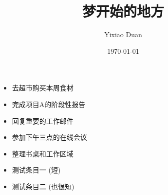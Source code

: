 \documentclass{ctexart}
\title{梦开始的地方}
\author{Yixiao Duan}
\date{\today}
\newcommand{\todo}[1]{\item[\hbox to 1.5em{$\Box$\hss}] #1}
\newcommand{\done}[1]{\item[\hbox to 1.5em{$\checkmark$\hss}] #1}
\begin{document}
\maketitle

\section*{\DTMToday} %

\begin{adjustbox}{center, fbox} %
    \begin{minipage}{4cm} %
        \begin{itemize}[label={}, leftmargin=*, nosep, itemsep=0pt, parsep=0pt, topsep=0pt]
            \todo{去超市购买本周食材}
            \done{完成项目A的阶段性报告}
            \todo{回复重要的工作邮件}
            \done{参加下午三点的在线会议}
            \todo{整理书桌和工作区域}
            \todo{测试条目一 (短)}
            \done{测试条目二 (也很短)}
        \end{itemize}
    \end{minipage}
\end{adjustbox}
\end{document}
